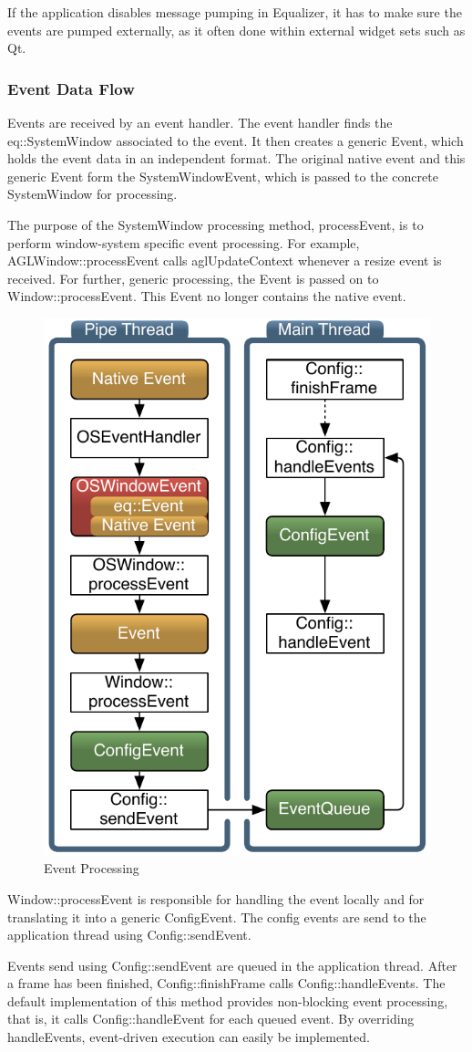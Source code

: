 \documentclass[10pt,a4]{scrartcl}
\begin{document}
If the application disables message pumping in Equalizer, it has to make
sure the events are pumped externally, as it often done within external
widget sets such as Qt.

\subsubsection{Event Data Flow}

Events are received by an event handler. The event handler finds the
\textsf{eq::Sys\-tem\-Win\-dow} associated to the event. It then creates a
generic \textsf{Event}, which holds the event data in an independent format. The
original native event and this generic \textsf{Event} form the
\textsf{SystemWindowEvent}, which is passed to the concrete
\textsf{SystemWindow} for processing.

The purpose of the \textsf{SystemWindow} processing method,
\textsf{processEvent}, is to perform window-system specific event
processing. For example, \textsf{AGLWindow::processEvent} calls
\textsf{aglUpdateContext} whenever a resize event is received. For
further, generic processing, the \textsf{Event} is passed on to
\textsf{Window::processEvent}. This \textsf{Event} no longer contains
the native event.

\begin{figure}
  \includegraphics[width=.382\textwidth]{images/eventFilter.pdf}
  {\caption{\label{fEventProcessing}Event Processing}}
\end{figure}
\textsf{Window::processEvent} is responsible for handling
the event locally and for translating it into a generic
\textsf{ConfigEvent}. The config events are send to the application
thread using \textsf{Config::sendEvent}. 

Events send using \textsf{Config::sendEvent} are queued in the
application thread. After a frame has been finished,
\textsf{Config::finishFrame} calls \textsf{Config::handleEvents}. The
default implementation of this method provides non-blocking event
processing, that is, it calls \textsf{Config::handleEvent} for each
queued event. By overriding \textsf{handleEvents}, event-driven
execution can easily be implemented.
\end{document}
